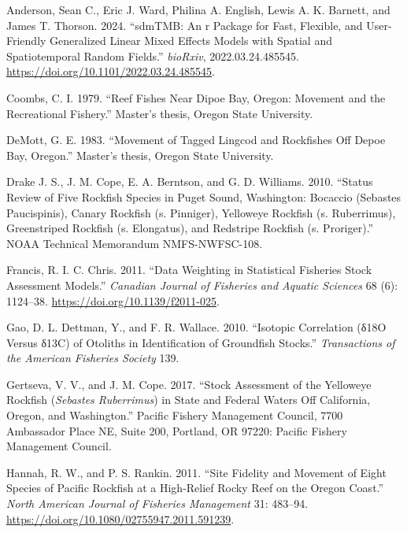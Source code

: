 \documentclass[
]{scrartcl}
\newlength{\cslhangindent}
\newenvironment{CSLReferences}[2] %
 {\begin{list}{}{%
  \setlength{\itemindent}{0pt}
  \setlength{\leftmargin}{0pt}
  \setlength{\parsep}{0pt}
  \ifodd #1
   \setlength{\leftmargin}{\cslhangindent}
   \setlength{\itemindent}{-1\cslhangindent}
  \fi
  \setlength{\itemsep}{#2\baselineskip}}}
 {\end{list}}
\begin{document}
\pagebreak

\label{refs}
\begin{CSLReferences}{1}{0}
Anderson, Sean C., Eric J. Ward, Philina A. English, Lewis A. K.
Barnett, and James T. Thorson. 2024. {``sdmTMB: An r Package for Fast,
Flexible, and User-Friendly Generalized Linear Mixed Effects Models with
Spatial and Spatiotemporal Random Fields.''} \emph{bioRxiv},
2022.03.24.485545. \url{https://doi.org/10.1101/2022.03.24.485545}.

Coombs, C. I. 1979. {``Reef Fishes Near Dipoe Bay, Oregon: Movement and
the Recreational Fishery.''} Master's thesis, Oregon State University.

DeMott, G. E. 1983. {``Movement of Tagged Lingcod and Rockfishes Off
Depoe Bay, Oregon.''} Master's thesis, Oregon State University.

Drake J. S., J. M. Cope, E. A. Berntson, and G. D. Williams. 2010.
{``Status Review of Five Rockfish Species in Puget Sound, Washington:
Bocaccio (Sebastes Paucispinis), Canary Rockfish (s. Pinniger),
Yelloweye Rockfish (s. Ruberrimus), Greenstriped Rockfish (s.
Elongatus), and Redstripe Rockfish (s. Proriger).''} NOAA Technical
Memorandum NMFS-NWFSC-108.

Francis, R. I. C. Chris. 2011. {``Data Weighting in Statistical
Fisheries Stock Assessment Models.''} \emph{Canadian Journal of
Fisheries and Aquatic Sciences} 68 (6): 1124--38.
\url{https://doi.org/10.1139/f2011-025}.

Gao, D. L. Dettman, Y., and F. R. Wallace. 2010. {``Isotopic Correlation
(δ18O Versus δ13C) of Otoliths in Identification of Groundfish
Stocks.''} \emph{Transactions of the American Fisheries Society} 139.

Gertseva, V. V., and J. M. Cope. 2017. {``Stock Assessment of the
Yelloweye Rockfish (\emph{{Sebastes} Ruberrimus}) in State and {Federal}
Waters Off {California}, {Oregon}, and {Washington}.''} Pacific Fishery
Management Council, 7700 Ambassador Place NE, Suite 200, Portland, OR
97220: Pacific Fishery Management Council.

Hannah, R. W., and P. S. Rankin. 2011. {``Site Fidelity and Movement of
Eight Species of Pacific Rockfish at a High-Relief Rocky Reef on the
Oregon Coast.''} \emph{North American Journal of Fisheries Management}
31: 483--94. \url{https://doi.org/10.1080/02755947.2011.591239}.


\end{CSLReferences}
\end{document}
